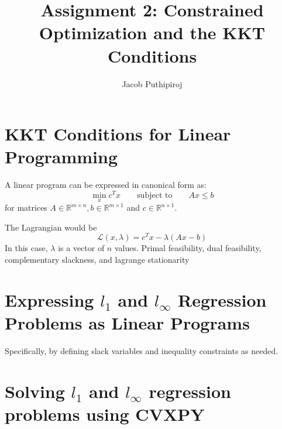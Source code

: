 \documentclass{article}
\begin{document}
\title{Assignment 2: Constrained Optimization and the KKT Conditions}
\author{Jacob Puthipiroj}
\maketitle

\section*{KKT Conditions for Linear Programming}


A linear program can be expressed in canonical form as:
$$ \min_x c^Tx \qquad \text{subject to} \qquad Ax \leq b$$
for matrices $A \in \mathbb{R}^{m \times n}, b \in \mathbb{R}^{m \times 1}$ and $c \in \mathbb{R}^{n \times 1}$.

The Lagrangian would be $$ \mathcal{L}(x,\lambda) = c^Tx - \lambda(Ax-b) $$
In this case, $\lambda$ is a vector of $n$ values. 
Primal feasibility, dual feasibility, complementary slackness, and lagrange stationarity

\section*{Expressing $l_1$ and $l_\infty$ Regression Problems as Linear Programs}
Specifically, by defining slack variables and inequality constraints as needed.


\section*{Solving $l_1$ and $l_\infty $ regression problems using CVXPY}
\end{document}

